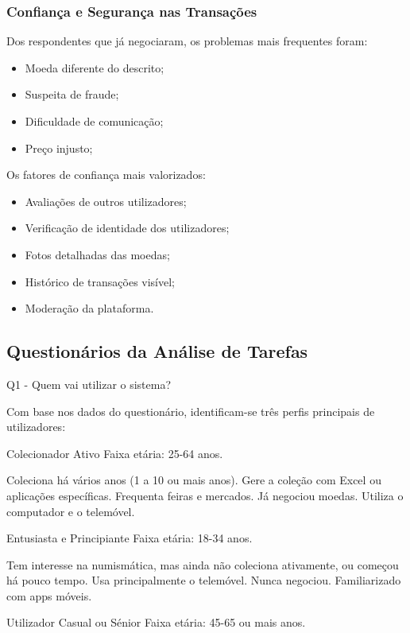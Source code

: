 \documentclass[12pt,a4paper]{article}
\begin{document}
\subsubsection{Confiança e Segurança nas Transações}

Dos respondentes que já negociaram, os problemas mais frequentes foram:

\begin{itemize}
\setlength{\itemsep}{0.15em}
\item Moeda diferente do descrito;
\item Suspeita de fraude;
\item Dificuldade de comunicação;
\item Preço injusto;
\end{itemize}

Os fatores de confiança mais valorizados:

\begin{itemize}
\setlength{\itemsep}{0.15em}
\item Avaliações de outros utilizadores;
\item Verificação de identidade dos utilizadores;
\item Fotos detalhadas das moedas;
\item Histórico de transações visível;
\item Moderação da plataforma.
\end{itemize}

\subsection{Questionários da Análise de Tarefas}

Q1 - Quem vai utilizar o sistema?

Com base nos dados do questionário, identificam-se três perfis principais de utilizadores:

Colecionador Ativo Faixa etária: 25-64 anos.

Coleciona há vários anos (1 a 10 ou mais anos). Gere a coleção com Excel ou aplicações específicas. Frequenta feiras e mercados. Já negociou moedas. Utiliza o computador e o telemóvel.

Entusiasta e Principiante Faixa etária: 18-34 anos.

Tem interesse na numismática, mas ainda não coleciona ativamente, ou começou há pouco tempo. Usa principalmente o telemóvel. Nunca negociou. Familiarizado com apps móveis.

Utilizador Casual ou Sénior Faixa etária: 45-65 ou mais anos.
\end{document}
